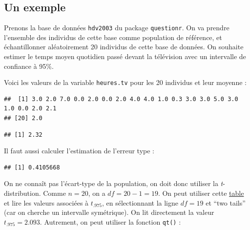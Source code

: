 \documentclass[
]{book}
\newenvironment{Shaded}{\begin{snugshade}}{\end{snugshade}}
\newcommand{\DecValTok}[1]{\textcolor[rgb]{0.00,0.00,0.81}{#1}}
\newcommand{\FunctionTok}[1]{\textcolor[rgb]{0.00,0.00,0.00}{#1}}
\newcommand{\NormalTok}[1]{#1}
\newcommand{\SpecialCharTok}[1]{\textcolor[rgb]{0.00,0.00,0.00}{#1}}
\begin{document}
\hypertarget{un-exemple}{%
\subsection{Un exemple}\label{un-exemple}}

Prenons la base de données \texttt{hdv2003} du package \texttt{questionr}. On va prendre l'ensemble des individus de cette base comme population de référence, et échantillonner aléatoirement 20 individus de cette base de données. On souhaite estimer le temps moyen quotidien passé devant la télévision avec un intervalle de confiance à 95\%.

Voici les valeurs de la variable \texttt{heures.tv} pour les 20 individus et leur moyenne :

\begin{Shaded}
\end{Shaded}

\begin{verbatim}
##  [1] 3.0 2.0 7.0 0.0 2.0 0.0 2.0 4.0 4.0 1.0 0.3 3.0 3.0 5.0 3.0 1.0 0.0 2.0 2.1
## [20] 2.0
\end{verbatim}

\begin{Shaded}
\end{Shaded}

\begin{verbatim}
## [1] 2.32
\end{verbatim}

Il faut aussi calculer l'estimation de l'erreur type :

\begin{Shaded}
\end{Shaded}

\begin{verbatim}
## [1] 0.4105668
\end{verbatim}

On ne connaît pas l'écart-type de la population, on doit donc utiliser la \emph{t}-distribution. Comme \(n=20\), on a \(df = 20 - 1 = 19\). On peut utiliser cette \href{https://www.sjsu.edu/faculty/gerstman/StatPrimer/t-table.pdf}{table} et lire les valeurs associées à \(t_{.975}\), en sélectionnant la ligne \(df = 19\) et ``two tails'' (car on cherche un intervalle symétrique). On lit directement la valeur \(t_{.975} = 2.093\). Autrement, on peut utiliser la fonction \texttt{qt()} :
\end{document}
